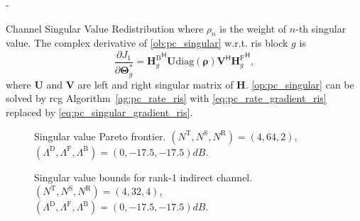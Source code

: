 \documentclass[journal]{IEEEtran}
\begin{document}
\begin{section}{-}
\begin{subsection}{Channel Singular Value Redistribution}
		where $\rho_n$ is the weight of $n$-th singular value.
		The complex derivative of \eqref{ob:pc_singular} w.r.t. \gls{ris} block $g$ is
		\begin{equation}
			\frac{\partial J_1}{\partial \mathbf{\Theta}_g^*} = {\mathbf{H}_g^\mathrm{B}}^\mathsf{H} \mathbf{U} \mathrm{diag}(\boldsymbol{\rho}) \mathbf{V}^\mathsf{H} {\mathbf{H}_g^\mathrm{F}}^\mathsf{H},
			\label{eq:pc_singular_gradient_ris}
		\end{equation}
		where $\mathbf{U}$ and $\mathbf{V}$ are left and right singular matrix of $\mathbf{H}$.
		\eqref{op:pc_singular} can be solved by \gls{rcg} Algorithm~\ref{ag:pc_rate_ris} with \eqref{eq:pc_rate_gradient_ris} replaced by \eqref{eq:pc_singular_gradient_ris}.

		\begin{figure}[!t]
			\centering
			\resizebox{0.65\columnwidth}{!}{
				
			}
			\caption{Singular value Pareto frontier. $(N^\mathrm{T}, N^\mathrm{S}, N^\mathrm{R}) = (4, 64, 2)$, $(\Lambda^\mathrm{D}, \Lambda^\mathrm{F}, \Lambda^\mathrm{B}) = (0, -17.5, -17.5) \unit{dB}$.}
			\label{sm:pc_singular_pareto}
		\end{figure}

		\begin{figure}[!t]
			\centering
			\resizebox{0.65\columnwidth}{!}{
				
			}
			\caption{Singular value bounds for rank-1 indirect channel. $(N^\mathrm{T}, N^\mathrm{S}, N^\mathrm{R}) = (4, 32, 4)$, $(\Lambda^\mathrm{D}, \Lambda^\mathrm{F}, \Lambda^\mathrm{B}) = (0, -17.5, -17.5) \unit{dB}$.}
			\label{sm:pc_singular_bound}
		\end{figure}


\end{subsection}
\end{section}
\end{document}

